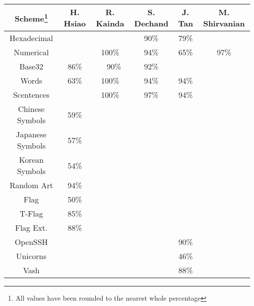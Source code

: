 \begin{tabular}{c|ccccc}
    \toprule
    \textbf{Scheme\footnote{All values have been rounded to the nearest whole percentage}} 
    & \textbf{H. Hsiao}\cite{hsiao2009study}      
    & \textbf{R. Kainda}\cite{kainda2009usability}      
    & \textbf{S. Dechand}\cite{dechand2016empirical}
    & \textbf{J. Tan}\cite{tan2017can}      
    & \textbf{M. Shirvanian}\cite{shirvanian2017pitfalls}
    \\\hline
    Hexadecimal     &        &        & 90\% & 79\% &            \\
    Numerical       &        & 100\%  & 94\% & 65\% & 97\%       \\
    Base32          & 86\%   & ~~90\% & 92\% &      &            \\
    Words           & 63\%   & 100\%  & 94\% & 94\% &            \\
    Scentences      &        & 100\%  & 97\% & 94\% &            \\
    Chinese Symbols & 59\%   &        &      &      &            \\
    Japanese Symbols& 57\%   &        &      &      &            \\
    Korean Symbols  & 54\%   &        &      &      &            \\
    \midrule
    Random Art	     & 94\%   &&&&\\
    Flag    	     & 50\%   &&&&\\
    T-Flag  	     & 85\%   &&&&\\
    Flag Ext.	     & 88\%   &&&&\\
    OpenSSH         &&&& 90\% &\\
    Unicorns         &&&& 46\% &\\
    Vash             &&&& 88\% &\\
    \bottomrule
\end{tabular}